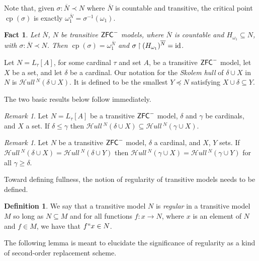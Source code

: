 \documentclass{amsart}
\newtheorem{fact}[theorem]{Fact}
\theoremstyle{definition}
\newtheorem{definition}[theorem]{Definition}
\theoremstyle{remark}
\newtheorem{remark}[theorem]{Remark}
\newcommand{\N}{{\overline{N}}}
\newcommand{\ZFC}{\textup{\ensuremath{\textsf{ZFC}}}}
\newcommand{\id}{\textup{\ensuremath{\text{id}}}}
\DeclareMathOperator{\cp}{cp}
\newcommand{\To}{\longrightarrow}
\newcommand{\rest}{\mathbin{\upharpoonright}}
\newcommand{\SH}{\mathcal{H}\textit{ull} \,}
\newcommand{\Sk}[3]{\SH^{#1}( {#2} \cup {#3} ) }
\begin{document}
Note that, given $\sigma: \N \prec N$ where $\N$ is countable and transitive, the critical point $\cp(\sigma)$ is exactly $\omega_1^{\N} = \sigma^{-1}(\omega_1)$.

\begin{fact} \label{fact:CPofourEmbeddings} Let $\N$, $N$ be transitive $\ZFC^-$ models, where $\N$ is countable and $H_{\omega_1} \subseteq N$, with $\sigma: \N \prec N$. Then $\cp(\sigma)=\omega_1^{\N}$ and $\sigma \rest (H_{\omega_1})^{\N} = \id$. \end{fact}

Let $N = L_\tau[A]$, for some cardinal $\tau$ and set $A$, be a transitive $\ZFC^-$ model, let $X$ be a set, and let $\delta$ be a cardinal. Our notation for the \emph{Skolem hull} of $\delta \cup X$ in $N$ is $\Sk{N}{\delta}{X}$. It is defined to be the smallest $Y \preccurlyeq N$ satisfying $X \cup \delta \subseteq Y$.
	
The two basic results below follow immediately.

\begin{remark} \label{remark:subsethull}
Let $N=L_\tau[A]$ be a transitive $\ZFC^-$ model, $\delta$ and $\gamma$ be cardinals, and $X$ a set. If $\delta \leq \gamma$ then $\Sk{N}{\delta}{X} \subseteq \Sk{N}{\gamma}{X}$. 
\end{remark}

\begin{remark} \label{remark:hullequality} Let $N$ be a transitive $\ZFC^-$ model, $\delta$ a cardinal, and $X$, $Y$ sets. If $\Sk{N}{\delta}{X} = \Sk{N}{\delta}{Y}$ then $\Sk{N}{\gamma}{X} = \Sk{N}{\gamma}{Y}$ for all $\gamma \geq \delta$. \end{remark}

Toward defining fullness, the notion of regularity of transitive models needs to be defined.

\begin{definition} We say that a transitive model $N$ is \emph{regular} in a transitive model $M$ so long as $N \subseteq M$ and for all functions $f: x \To N$, where $x$ is an element of $N$ and $f \in M$, we have that $f``x \in N$. \end{definition}
The following lemma is meant to elucidate the significance of regularity as a kind of second-order
replacement scheme.
\end{document}
